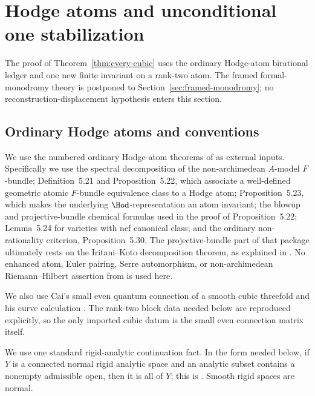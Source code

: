 \section{Hodge atoms and unconditional one stabilization}
\label{sec:atomic-one-step}

The proof of Theorem~\ref{thm:every-cubic} uses the ordinary Hodge-atom
birational ledger and one new finite invariant on a rank-two atom.  The
framed formal-monodromy theory is postponed to
Section~\ref{sec:framed-monodromy}; no reconstruction-displacement
hypothesis enters this section.

\subsection{Ordinary Hodge atoms and conventions}
We use the numbered ordinary Hodge-atom theorems of \cite{KKPYY} as external inputs.  Specifically we use the spectral decomposition of the
non-archimedean $A$-model $F$-bundle; Definition~5.21 and
Proposition~5.22, which associate a well-defined geometric atomic
$F$-bundle equivalence class to a Hodge atom; Proposition~5.23, which makes
the underlying $\Hod$-representation an atom invariant; the blowup and
projective-bundle chemical formulas used in the proof of Proposition~5.22;
Lemma~5.24 for varieties with nef canonical class; and the ordinary
non-rationality criterion, Proposition~5.30.  The projective-bundle part of
that package ultimately rests on the Iritani--Koto decomposition theorem, as
explained in \cite{KKPYY}.  No
enhanced atom, Euler pairing, Serre automorphism, or non-archimedean
Riemann--Hilbert assertion from \cite{KKPYY} is used here.

We also use Cai's small even quantum connection of a smooth cubic threefold
and his curve calculation \cite{Cai}.  The rank-two block data needed below
are reproduced explicitly, so the only imported cubic datum is the small
even connection matrix itself.

We use one standard rigid-analytic continuation fact.  In the form needed
below, if $Y$ is a connected normal rigid analytic space and an analytic
subset contains a nonempty admissible open, then it is all of $Y$; this is
\cite[Lemma~2.1.4]{Conrad}.  Smooth rigid spaces are normal.

